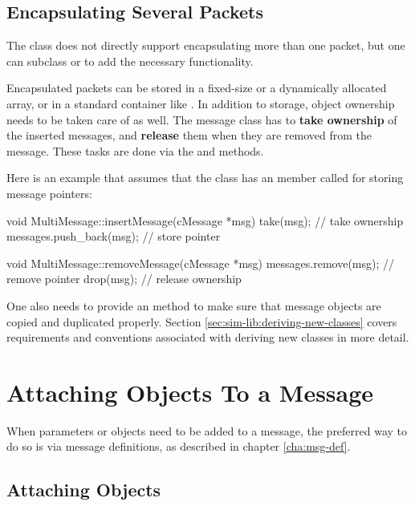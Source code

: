 \subsection{Encapsulating Several Packets}
\label{sec:messages:encapsulating-several-packets}

The  class does not directly support encapsulating more
than one packet, but one can subclass  or 
to add the necessary functionality.

Encapsulated packets can be stored in a fixed-size or a dynamically
allocated array, or in a standard container like .
In addition to storage, object ownership needs to be taken care of as well.
The message class has to \textbf{take ownership} of the inserted messages, and
\textbf{release} them when they are removed from the message. These tasks are
done via the  and  methods.

Here is an example that assumes that the class has an  member
called  for storing message pointers:

\begin{cpp}
void MultiMessage::insertMessage(cMessage *msg)
{
    take(msg);  // take ownership
    messages.push_back(msg);  // store pointer
}

void MultiMessage::removeMessage(cMessage *msg)
{
    messages.remove(msg);  // remove pointer
    drop(msg);  // release ownership
}
\end{cpp}

One also needs to provide an  method to make sure that
message objects are copied and duplicated properly. Section
\ref{sec:sim-lib:deriving-new-classes} covers requirements and conventions
associated with deriving new classes in more detail.



\section{Attaching Objects To a Message}
\label{sec:msgs:attaching-objects}

When parameters or objects need to be added to a message, the preferred
way to do so is via message definitions, as described in chapter
\ref{cha:msg-def}.


\subsection{Attaching Objects}
\label{sec:messages:attaching-objects}

